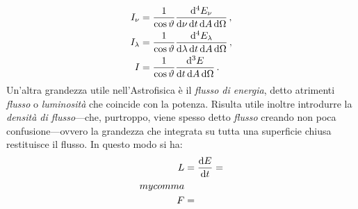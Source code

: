    \begin{align}
        I_\nu &= \frac{1}{\cos\vartheta}\frac{\dd[4] E_\nu}{\dd{\nu} \dd{t} \dd{A} \dd{\Omega}} \,, \\
        I_\lambda &= \frac{1}{\cos\vartheta}\frac{\dd[4] E_\lambda}{\dd{\lambda} \dd{t} \dd{A} \dd{\Omega}}
        \,, \\
        I &= \frac{1}{\cos\vartheta}\frac{\dd[3] E}{\dd t \dd{A} \dd{\Omega}}
        \,.
    \end{align}
    Un'altra grandezza utile nell'Astrofisica è il \emph{flusso di energia}, detto atrimenti \emph{flusso} o \emph{luminosità} che coincide con la potenza. Risulta utile inoltre introdurre la \emph{densità di flusso}---che, purtroppo, viene spesso detto \emph{flusso}  creando non poca confusione---ovvero la grandezza che integrata su tutta una superficie chiusa restituisce il flusso. In questo modo si ha:
    \begin{align}
        L &= \dv{E}{t} = \\mycomma \\
        F &= 
    \end{align}